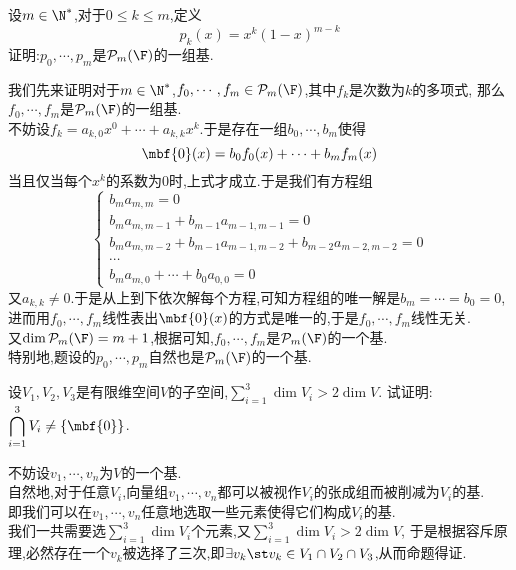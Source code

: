 \documentclass{ctexart}
\begin{document}
\begin{problem}[Example 2.]
    设$m\in\N^*$,对于$0\leqslant k\leqslant m$,定义
    $$p_k(x)=x^k(1-x)^{m-k}$$
    证明:$p_0,\cdots,p_m$是$\mathcal{P}_m(\F)$的一组基.
\end{problem}
\begin{solution}[Proof.]
    我们先来证明对于$m\in\N^*$,$f_0,\cdots,f_m\in\mathcal{P}_m(\F)$,其中$f_k$是次数为$k$的多项式,
    那么$f_0,\cdots,f_m$是$\mathcal{P}_m(\F)$的一组基.\\
    不妨设$f_k=a_{k,0}x^0+\cdots+a_{k,k}x^k$.于是存在一组$b_0,\cdots,b_m$使得
    $$\mbf{0}(x)=b_0f_0(x)+\cdots+b_mf_m(x)$$
    当且仅当每个$x^k$的系数为$0$时,上式才成立.于是我们有方程组
    $$\left\{\begin{array}{l}
        b_ma_{m,m}=0\\
        b_ma_{m,m-1}+b_{m-1}a_{m-1,m-1}=0\\
        b_ma_{m,m-2}+b_{m-1}a_{m-1,m-2}+b_{m-2}a_{m-2,m-2}=0\\
        \cdots\\
        b_ma_{m,0}+\cdots+b_0a_{0,0}=0
    \end{array}\right.$$
    又$a_{k,k}\neq 0$.于是从上到下依次解每个方程,可知方程组的唯一解是$b_m=\cdots=b_0=0$,
    进而用$f_0,\cdots,f_m$线性表出$\mbf{0}(x)$的方式是唯一的,于是$f_0,\cdots,f_m$线性无关.\\
    又$\dim\mathcal{P}_m(\F)=m+1$,根据可知,$f_0,\cdots,f_m$是$\mathcal{P}_m(\F)$的一个基.\\
    特别地,题设的$p_0,\cdots,p_m$自然也是$\mathcal{P}_m(\F)$的一个基.
\end{solution}
\begin{problem}[Example 3.]
    设$V_1,V_2,V_3$是有限维空间$V$的子空间,$\displaystyle\sum_{i=1}^{3}\dim V_i>2\dim V$.
    试证明:$\displaystyle\bigcap_{i=1}^3V_i\neq\left\{\mbf{0}\right\}$.
\end{problem}
\begin{solution}[Proof.]
    不妨设$v_1,\cdots,v_n$为$V$的一个基.\\
    自然地,对于任意$V_i$,向量组$v_1,\cdots,v_n$都可以被视作$V_i$的张成组而被削减为$V_i$的基.\\
    即我们可以在$v_1,\cdots,v_n$任意地选取一些元素使得它们构成$V_i$的基.\\
    我们一共需要选$\displaystyle\sum_{i=1}^{3}\dim V_i$个元素,又$\displaystyle\sum_{i=1}^{3}\dim V_i>2\dim V$,
    于是根据容斥原理,必然存在一个$v_k$被选择了三次,即$\exists v_k\st v_k\in V_1\cap V_2\cap V_3$,从而命题得证.
\end{solution}
\end{document}
